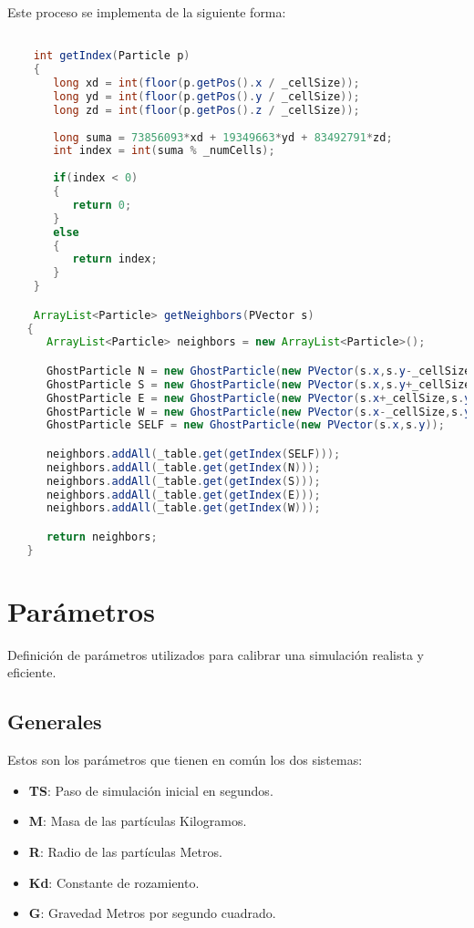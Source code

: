 \documentclass{article}
\begin{document}
Este proceso se implementa de la siguiente forma:
\begin{lstlisting}[language=Java, frame=single]

    int getIndex(Particle p)
    {
       long xd = int(floor(p.getPos().x / _cellSize));
       long yd = int(floor(p.getPos().y / _cellSize));
       long zd = int(floor(p.getPos().z / _cellSize));
 
       long suma = 73856093*xd + 19349663*yd + 83492791*zd;
       int index = int(suma % _numCells);
 
       if(index < 0)
       {
          return 0;
       }
       else
       {
          return index;
       }
    }

    ArrayList<Particle> getNeighbors(PVector s)
   {
      ArrayList<Particle> neighbors = new ArrayList<Particle>();

      GhostParticle N = new GhostParticle(new PVector(s.x,s.y-_cellSize));
      GhostParticle S = new GhostParticle(new PVector(s.x,s.y+_cellSize));
      GhostParticle E = new GhostParticle(new PVector(s.x+_cellSize,s.y));
      GhostParticle W = new GhostParticle(new PVector(s.x-_cellSize,s.y));
      GhostParticle SELF = new GhostParticle(new PVector(s.x,s.y));

      neighbors.addAll(_table.get(getIndex(SELF)));
      neighbors.addAll(_table.get(getIndex(N)));
      neighbors.addAll(_table.get(getIndex(S)));
      neighbors.addAll(_table.get(getIndex(E)));
      neighbors.addAll(_table.get(getIndex(W)));

      return neighbors;    
   }
\end{lstlisting}

\section{Parámetros}\label{sec:parametros}

Definición de parámetros utilizados para calibrar una simulación realista y eficiente.

\subsection{Generales}\label{sec:parametros-generales}
Estos son los parámetros que tienen en común los dos sistemas:
\begin{itemize}
    \item \textbf{TS}: Paso de simulación inicial en segundos.
    \item \textbf{M}: Masa de las partículas Kilogramos.
    \item \textbf{R}: Radio de las partículas Metros.
    \item \textbf{Kd}: Constante de rozamiento.
    \item \textbf{G}: Gravedad Metros por segundo cuadrado.
\end{itemize}
\end{document}
